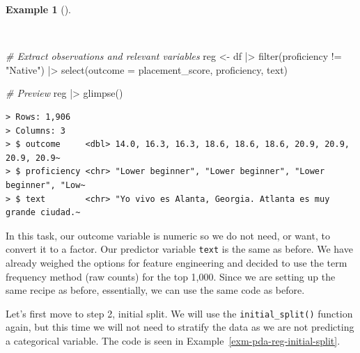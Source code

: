\documentclass[
  letterpaper,
  DIV=11,
  numbers=noendperiod]{scrreprt}
\newenvironment{Shaded}{\begin{snugshade}}{\end{snugshade}}
\newcommand{\AttributeTok}[1]{\textcolor[rgb]{0.00,0.00,0.00}{#1}}
\newcommand{\CommentTok}[1]{\textcolor[rgb]{0.00,0.00,0.00}{\textit{#1}}}
\newcommand{\FunctionTok}[1]{\textcolor[rgb]{0.00,0.00,0.00}{#1}}
\newcommand{\NormalTok}[1]{\textcolor[rgb]{0.00,0.00,0.00}{#1}}
\newcommand{\OtherTok}[1]{\textcolor[rgb]{0.00,0.00,0.00}{#1}}
\newcommand{\SpecialCharTok}[1]{\textcolor[rgb]{0.00,0.00,0.00}{#1}}
\newcommand{\StringTok}[1]{\textcolor[rgb]{0.00,0.00,0.00}{#1}}
\theoremstyle{definition}
\newtheorem{example}{Example}[chapter]
\theoremstyle{remark}
\begin{document}
\begin{example}[]\protect\hypertarget{exm-pda-reg-data}{}\label{exm-pda-reg-data}

~

\begin{Shaded}
\begin{Highlighting}[]
\CommentTok{\# Extract observations and relevant variables}
\NormalTok{reg }\OtherTok{\textless{}{-}}
\NormalTok{  df }\SpecialCharTok{|\textgreater{}}
  \FunctionTok{filter}\NormalTok{(proficiency }\SpecialCharTok{!=} \StringTok{"Native"}\NormalTok{) }\SpecialCharTok{|\textgreater{}}
  \FunctionTok{select}\NormalTok{(}\AttributeTok{outcome =}\NormalTok{ placement\_score, proficiency, text)}

\CommentTok{\# Preview}
\NormalTok{reg }\SpecialCharTok{|\textgreater{}} \FunctionTok{glimpse}\NormalTok{()}
\end{Highlighting}
\end{Shaded}

\begin{verbatim}
> Rows: 1,906
> Columns: 3
> $ outcome     <dbl> 14.0, 16.3, 16.3, 18.6, 18.6, 18.6, 20.9, 20.9, 20.9, 20.9~
> $ proficiency <chr> "Lower beginner", "Lower beginner", "Lower beginner", "Low~
> $ text        <chr> "Yo vivo es Alanta, Georgia. Atlanta es muy grande ciudad.~
\end{verbatim}

\end{example}

In this task, our outcome variable is numeric so we do not need, or
want, to convert it to a factor. Our predictor variable \texttt{text} is
the same as before. We have already weighed the options for feature
engineering and decided to use the term frequency method (raw counts)
for the top 1,000. Since we are setting up the same recipe as before,
essentially, we can use the same code as before.

Let's first move to step 2, initial split. We will use the
\texttt{initial\_split()} function again, but this time we will not need
to stratify the data as we are not predicting a categorical variable.
The code is seen in Example~\ref{exm-pda-reg-initial-split}.
\end{document}
